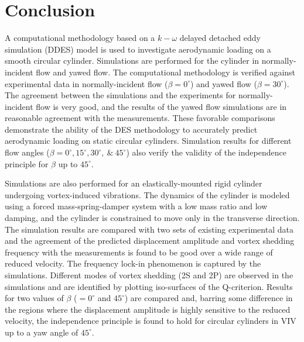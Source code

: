 \documentclass[12pt,authoryear]{elsarticle}
\begin{document}




%



\section{Conclusion}
\label{sec:conclusions}
%
A computational methodology based on a $k-\omega$ delayed detached eddy
simulation (DDES) model is used to investigate aerodynamic loading on a smooth
circular cylinder. Simulations are performed for the cylinder in
normally-incident flow and yawed flow. The computational methodology is
verified against experimental data in normally-incident flow ($\beta=0^\circ$)
and yawed flow ($\beta=30^\circ$). The agreement between the simulations and
the experiments for normally-incident flow is very good, and the results of the
yawed flow simulations are in reasonable agreement with the measurements.
These favorable comparisons demonstrate the ability of the DES methodology to
accurately predict aerodynamic loading on static circular cylinders. Simulation
results for different flow angles ($\beta =0^\circ, 15^\circ,
30^\circ,~\&~45^\circ$) also verify the validity of the independence principle
for $\beta$ up to $45^\circ$.

Simulations are also performed for an elastically-mounted rigid cylinder
undergoing vortex-induced vibrations. The dynamics of the cylinder is modeled
using a forced mass-spring-damper system with a low mass ratio and low damping,
and the cylinder is constrained to move only in the transverse direction.  The
simulation results are compared with two sets of existing experimental data and
the agreement of the predicted displacement amplitude and vortex shedding
frequency with the measurements is found to be good over a wide range of
reduced velocity. The frequency lock-in phenomenon is captured by the
simulations. Different modes of vortex shedding (2S and 2P) are observed in the
simulations and are identified by plotting iso-surfaces of the Q-criterion.
Results for two values of $\beta$ ($=0^\circ$ and $45^\circ$) are compared and,
barring some difference in the regions where the displacement amplitude is
highly sensitive to the reduced velocity, the independence principle is found
to hold for circular cylinders in VIV up to a yaw angle of $45^\circ$. 
\end{document}
